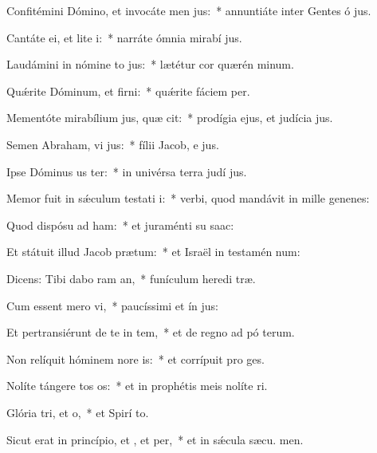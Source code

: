\item Confitémini Dómino, et invocáte men jus:~* annuntiáte inter Gentes ó jus.
\item Cantáte ei, et lite i:~* narráte ómnia mirabí jus.
\item Laudámini in nómine to jus:~* lætétur cor quærén minum.
\item Quǽrite Dóminum, et firni:~* quǽrite fáciem  per.
\item Mementóte mirabílium jus, quæ cit:~* prodígia ejus, et judícia  jus.
\item Semen Abraham, vi jus:~* fílii Jacob, e jus.
\item Ipse Dóminus us ter:~* in univérsa terra judí jus.
\item Memor fuit in sǽculum testati i:~* verbi, quod mandávit in mille genenes:
\item Quod dispósu ad ham:~* et juraménti su  saac:
\item Et státuit illud Jacob  prætum:~* et Israël in testamén num:
\item Dicens: Tibi dabo ram an,~* funículum heredi træ.
\item Cum essent mero vi,~* paucíssimi et ín jus:
\item Et pertransiérunt de te in tem,~* et de regno ad pó terum.
\item Non relíquit hóminem nore is:~* et corrípuit pro  ges.
\item Nolíte tángere tos os:~* et in prophétis meis nolíte ri.
\item Glória tri, et o,~* et Spirí to.
\item Sicut erat in princípio, et , et per,~* et in sǽcula sæcu. men.
